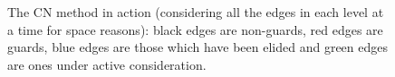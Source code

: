 \documentclass[preprint,a4paper]{elsarticle}
\newenvironment{stusubfig}[1]
{
	\begin{figure}[#1]
	\begin{center}
}
{
	\end{center}
	\end{figure}
}
\begin{document}
\begin{stusubfig}{p}
	\hspace{4mm}%
	\hspace{4mm}%
\caption[The CN method in action]{The CN method in action (considering all the edges in each level at a time for space reasons): black edges are non-guards, red edges are guards, blue edges are those which have been elided and green edges are ones under active consideration.}
\label{fig:segmentation-waterfall-nicholls-example}
\end{stusubfig}
\end{document}
